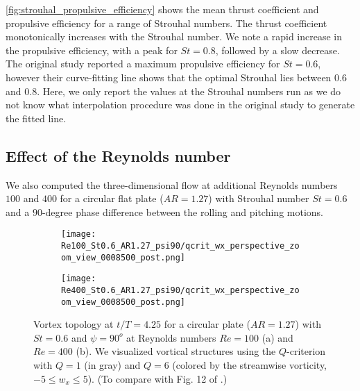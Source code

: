\cref{fig:strouhal_propulsive_efficiency} shows the mean thrust coefficient and propulsive efficiency for a range of Strouhal numbers.
The thrust coefficient monotonically increases with the Strouhal number.
We note a rapid increase in the propulsive efficiency, with a peak for $St = 0.8$, followed by a slow decrease.
The original study reported a maximum propulsive efficiency for $St = 0.6$, however their curve-fitting line shows that the optimal Strouhal lies between $0.6$ and $0.8$.
Here, we only report the values at the Strouhal numbers run as we do not know what interpolation procedure was done in the original study to generate the fitted line.

\subsection{Effect of the Reynolds number}

We also computed the three-dimensional flow at additional Reynolds numbers $100$ and $400$ for a circular flat plate ($AR = 1.27$) with Strouhal number $St = 0.6$ and a $90$-degree phase difference between the rolling and pitching motions.

\begin{figure}[!h]
  \centering
  \begin{subfigure}[c]{0.45\textwidth}
    \centering
    \texttt{[image: Re100\_St0.6\_AR1.27\_psi90/qcrit\_wx\_perspective\_zoom\_view\_0008500\_post.png]}
    \caption{}
    \label{fig:reynolds_wake_topology:100_perspective}
  \end{subfigure}
  \hfill
  \begin{subfigure}[c]{0.45\textwidth}
    \centering
    \texttt{[image: Re400\_St0.6\_AR1.27\_psi90/qcrit\_wx\_perspective\_zoom\_view\_0008500\_post.png]}
    \caption{}
    \label{fig:reynolds_wake_topology:400_perspective}
  \end{subfigure}
  \caption{Vortex topology at $t / T = 4.25$ for a circular plate ($AR = 1.27$) with $St = 0.6$ and $\psi = 90^o$ at Reynolds numbers $Re = 100$ (a) and $Re = 400$ (b). We visualized vortical structures using the $Q$-criterion with $Q = 1$ (in gray) and $Q = 6$ (colored by the streamwise vorticity, $-5 \leq w_x \leq 5$). (To compare with Fig. 12 of \citet{li_dong_2016}.)}
  \label{fig:reynolds_wake_topology}
\end{figure}

